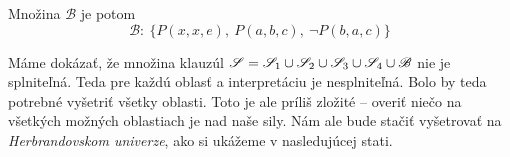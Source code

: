\begin{priklad}
    Množina $\mathscr{B}$ je potom
    \begin{equation*}
        \mathscr{B}:\  \Big\{P(x,x,e),\ P(a,b,c),\ \neg P(b,a,c) \Big\}
    \end{equation*}

    Máme dokázať, že množina klauzúl 
    $\mathscr{S} = \mathscr{S}_1 \cup \mathscr{S}_2 \cup
        \mathscr{S}_3 \cup \mathscr{S}_4 \cup \mathscr{B}$
    nie je splniteľná. Teda pre každú oblasť a interpretáciu je
    nesplniteľná.
    Bolo by teda potrebné vyšetriť všetky oblasti.
    Toto je ale príliš zložité -- overiť niečo na všetkých možných
    oblastiach je nad naše sily.
    Nám ale bude stačiť vyšetrovať na {\it Herbrandovskom univerze},
    ako si ukážeme v nasledujúcej stati.
\end{priklad}
